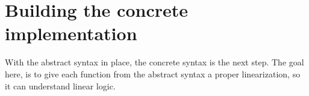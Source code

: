 \section{Building the concrete implementation}
\label{04_02}

With the abstract syntax in place, the concrete syntax is the next step. The goal here, is to give each function from the abstract syntax a proper linearization, so it can understand linear logic.